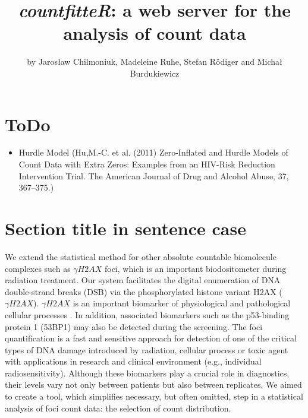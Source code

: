 \title{\emph{countfitteR}: a web server for the analysis of count data}
\author{by Jaros\l{}aw Chilmoniuk, Madeleine Ruhe, Stefan R\"{o}diger and Micha\l{} Burdukiewicz}

\maketitle


\section{ToDo}

\begin{itemize}
 \item Hurdle Model (Hu,M.-C. et al. (2011) Zero-Inflated and Hurdle Models of Count Data with Extra Zeros: Examples from an HIV-Risk Reduction Intervention Trial. The American Journal of Drug and Alcohol Abuse, 37, 367–375.)
\end{itemize}


\section{Section title in sentence case}

We extend the statistical method for other absolute countable 
biomolecule complexes such as $\gamma H2AX$ foci, which is an important 
biodositometer during radiation treatment. Our system facilitates the digital 
enumeration of DNA double-strand breaks (DSB) via the phosphorylated histone 
variant H2AX ($\gamma H2AX$). $\gamma H2AX$ is an important biomarker of physiological 
and pathological cellular processes \cite{reddig_dna_2018,rodiger_quantification_2018}. In addition, associated biomarkers such as 
the p53-binding protein 1 (53BP1) may also be detected during the screening. The 
foci quantification is a fast and sensitive approach for detection of one of the 
critical types of DNA damage introduced by radiation, cellular process or toxic 
agent with applications in research and clinical environment (e.g., individual 
radiosensitivity). Although these biomarkers play a crucial role in diagnostics, 
their levels vary not only between patients but also between replicates. We 
aimed to create a tool, which simplifies necessary, but often omitted, step in a 
statistical analysis of foci count data: the selection of count distribution.

